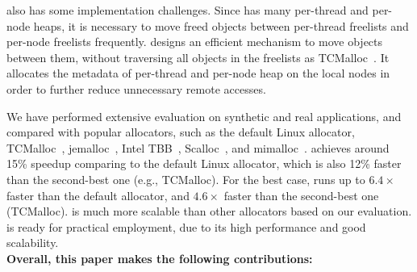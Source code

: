  
\NM{} also has some implementation challenges. Since \NM{} has many per-thread and per-node heaps, it is necessary to move freed objects between per-thread freelists and per-node freelists frequently. \NM{} designs an efficient mechanism to move objects between them, without traversing all objects in the freelists as TCMalloc~\cite{tcmalloc}.  It allocates the metadata of per-thread and per-node heap on the local nodes in order to further reduce unnecessary remote accesses.  


We have performed extensive evaluation on synthetic and real applications, and compared \NM{} with popular allocators, such as the default Linux allocator, TCMalloc~\cite{tcmalloc}, jemalloc~\cite{jemalloc}, Intel TBB~\cite{tbb}, Scalloc~\cite{Scalloc}, and mimalloc~\cite{mimalloc}. \NM{} achieves around 15\% speedup comparing to the default Linux allocator, which is also 12\% faster than the second-best one (e.g., TCMalloc). For the best case, \NM{} runs up to $6.4\times$ faster than the default allocator, and $4.6\times$ faster than the second-best one (TCMalloc). \NM{} is much more scalable than other allocators based on our evaluation. \NM{} is ready for practical employment, due to its high performance and good scalability. \\

\textbf{Overall, this paper makes the following contributions:} 

